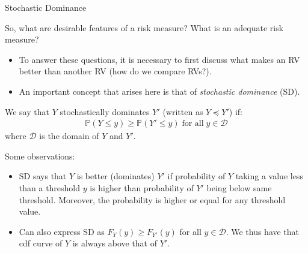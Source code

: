 \documentclass[handout,9pt]{beamer}
\begin{document}
%
\begin{frame}{Stochastic Dominance}
\begin{block}{}
So, what are desirable features of a risk measure? What is an adequate risk measure?
\end{block}
\begin{itemize}
\item To answer these questions, it is necessary to first discuss what makes an RV better than another RV (how do we compare RVs?). 

\item An important concept that arises here is that of {\em stochastic dominance} (SD).

\end{itemize}

\begin{block}{}
We say that $Y$ stochastically dominates $Y'$ (written as $Y\preceq Y'$) if:
\begin{align*}
\mathbb{P}(Y\leq y)\geq \mathbb{P}(Y'\leq y)\; \textrm{for all}\;  y\in \mathcal{D}
\end{align*}
where $\mathcal{D}$ is the domain of $Y$ and $Y'$. 
\end{block}
Some observations:
\begin{itemize}
   \setlength{\itemsep}{10pt}
\item SD says that $Y$ is better (dominates) $Y'$ if probability of $Y$ taking a value less than a threshold $y$ is higher than probability of $Y'$ being below same threshold. Moreover, the probability is higher or equal for any threshold value. 
\item Can also express SD as $F_{Y}(y)\geq F_{Y'}(y)$ for all $y\in\mathcal{D}$. We thus have that cdf curve of $Y$ is always above that of $Y'$. 

\end{itemize}


\end{frame}
\end{document}
